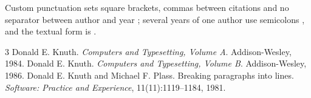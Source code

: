 \documentclass{article}
\begin{document}
Custom punctuation sets square brackets, commas between citations and no
separator between author and year \citep{knuth84,plass81}; several years of
one author use semicolons \citep{knuth84,knuth86}, and the textual form is
\citet{plass81}.

\begin{thebibliography}{3}
 Donald E. Knuth. \emph{Computers and Typesetting, Volume A}. Addison-Wesley, 1984.
 Donald E. Knuth. \emph{Computers and Typesetting, Volume B}. Addison-Wesley, 1986.
 Donald E. Knuth and Michael F. Plass.
  Breaking paragraphs into lines. \emph{Software: Practice and Experience},
  11(11):1119--1184, 1981.
\end{thebibliography}
\end{document}
